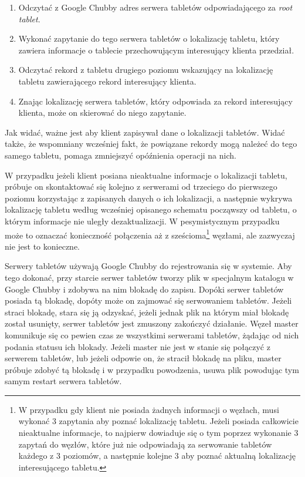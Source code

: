 \begin{enumerate}
 \item Odczytać z Google Chubby adres serwera tabletów odpowiadającego za \emph{root tablet}.
 \item Wykonać zapytanie do tego serwera tabletów o lokalizację tabletu, który zawiera informacje o tablecie przechowującym interesujący klienta przedział.
 \item Odczytać rekord z tabletu drugiego poziomu wskazujący na lokalizację tabletu zawierającego rekord interesujący klienta.
 \item Znając lokalizację serwera tabletów, który odpowiada za rekord interesujący klienta, może on skierować do niego zapytanie.
\end{enumerate}

Jak widać, ważne jest aby klient zapisywał dane o lokalizacji tabletów.
Widać także, że wspomniany wcześniej fakt, że powiązane rekordy mogą należeć do tego samego tabletu, pomaga zmniejszyć opóźnienia operacji na nich.

W przypadku jeżeli klient posiana nieaktualne informacje o lokalizacji tabletu, próbuje on skontaktować się kolejno z serwerami od trzeciego do pierwszego poziomu korzystając z zapisanych danych o ich lokalizacji, a następnie wykrywa lokalizację tabletu według wcześniej opisanego schematu począwszy od tabletu, o którym informacje nie uległy dezaktualizacji.
W pesymistycznym przypadku może to oznaczać konieczność połączenia aż z sześcioma\footnote{W przypadku gdy klient nie posiada żadnych informacji o węzłach, musi wykonać 3 zapytania aby poznać lokalizację tabletu. Jeżeli posiada całkowicie nieaktualne informacje, to najpierw dowiaduje się o tym poprzez wykonanie 3 zapytań do węzłów, które już nie odpowiadają za serwowanie tabletów każdego z 3 poziomów, a następnie kolejne 3 aby poznać aktualną lokalizację interesującego tabletu.} węzłami, ale zazwyczaj nie jest to konieczne.

Serwery tabletów używają Google Chubby do rejestrowania się w systemie.
Aby tego dokonać, przy starcie serwer tabletów tworzy plik w specjalnym katalogu w Google Chubby i zdobywa na nim blokadę do zapisu.
Dopóki serwer tabletów posiada tą blokadę, dopóty może on zajmować się serwowaniem tabletów.
Jeżeli straci blokadę, stara się ją odzyskać, jeżeli jednak plik na którym miał blokadę został usunięty, serwer tabletów jest zmuszony zakończyć działanie.
Węzeł master komunikuje się co pewien czas ze wszystkimi serwerami tabletów, żądając od nich podania statusu ich blokady.
Jeżeli master nie jest w stanie się połączyć z serwerem tabletów, lub jeżeli odpowie on, że stracił blokadę na pliku, master próbuje zdobyć tą blokadę i w przypadku powodzenia, usuwa plik powodując tym samym restart serwera tabletów.

